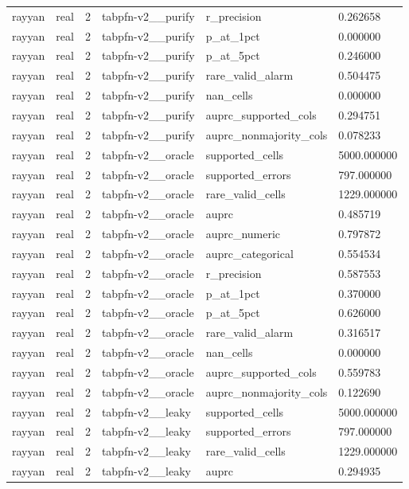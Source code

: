 \begin{tabular}{llllll}
rayyan & real & 2 & tabpfn-v2\_\_purify & r\_precision & 0.262658 \\
rayyan & real & 2 & tabpfn-v2\_\_purify & p\_at\_1pct & 0.000000 \\
rayyan & real & 2 & tabpfn-v2\_\_purify & p\_at\_5pct & 0.246000 \\
rayyan & real & 2 & tabpfn-v2\_\_purify & rare\_valid\_alarm & 0.504475 \\
rayyan & real & 2 & tabpfn-v2\_\_purify & nan\_cells & 0.000000 \\
rayyan & real & 2 & tabpfn-v2\_\_purify & auprc\_supported\_cols & 0.294751 \\
rayyan & real & 2 & tabpfn-v2\_\_purify & auprc\_nonmajority\_cols & 0.078233 \\
rayyan & real & 2 & tabpfn-v2\_\_oracle & supported\_cells & 5000.000000 \\
rayyan & real & 2 & tabpfn-v2\_\_oracle & supported\_errors & 797.000000 \\
rayyan & real & 2 & tabpfn-v2\_\_oracle & rare\_valid\_cells & 1229.000000 \\
rayyan & real & 2 & tabpfn-v2\_\_oracle & auprc & 0.485719 \\
rayyan & real & 2 & tabpfn-v2\_\_oracle & auprc\_numeric & 0.797872 \\
rayyan & real & 2 & tabpfn-v2\_\_oracle & auprc\_categorical & 0.554534 \\
rayyan & real & 2 & tabpfn-v2\_\_oracle & r\_precision & 0.587553 \\
rayyan & real & 2 & tabpfn-v2\_\_oracle & p\_at\_1pct & 0.370000 \\
rayyan & real & 2 & tabpfn-v2\_\_oracle & p\_at\_5pct & 0.626000 \\
rayyan & real & 2 & tabpfn-v2\_\_oracle & rare\_valid\_alarm & 0.316517 \\
rayyan & real & 2 & tabpfn-v2\_\_oracle & nan\_cells & 0.000000 \\
rayyan & real & 2 & tabpfn-v2\_\_oracle & auprc\_supported\_cols & 0.559783 \\
rayyan & real & 2 & tabpfn-v2\_\_oracle & auprc\_nonmajority\_cols & 0.122690 \\
rayyan & real & 2 & tabpfn-v2\_\_leaky & supported\_cells & 5000.000000 \\
rayyan & real & 2 & tabpfn-v2\_\_leaky & supported\_errors & 797.000000 \\
rayyan & real & 2 & tabpfn-v2\_\_leaky & rare\_valid\_cells & 1229.000000 \\
rayyan & real & 2 & tabpfn-v2\_\_leaky & auprc & 0.294935 \\

\end{tabular}
